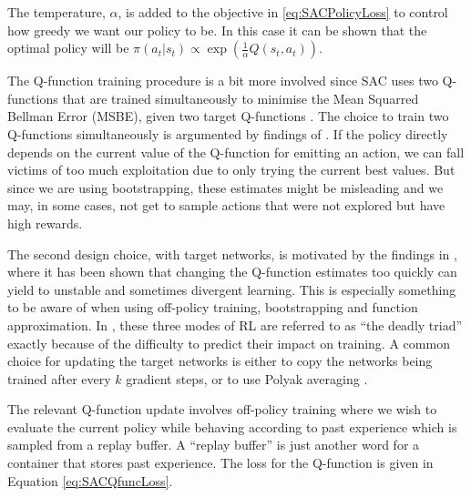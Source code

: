 \documentclass{report}
\numberwithin{equation}{section}
\numberwithin{figure}{section}
\numberwithin{table}{section}
\numberwithin{algorithm}{section}
\begin{document}
The temperature, $\alpha$, is added to the objective in 
\ref{eq:SACPolicyLoss} to control how greedy we want our policy 
to be. In this case it can be shown that the optimal policy 
will be $\pi(a_t|s_t)\propto\exp\left(\frac{1}{\alpha}Q(s_t,a_t)\right)$.

The Q-function training procedure is a bit more involved 
since SAC uses two Q-functions \citep{HasseltDoubleQlearning} 
that are trained simultaneously to 
minimise the Mean Squarred Bellman Error (MSBE), given two 
target Q-functions \citep{DQN}. The choice to train 
two Q-functions simultaneously 
is argumented by findings of \cite{HasseltDoubleQlearning}. 
If the policy directly depends on the current 
value of the Q-function for emitting an action, we can fall 
victims of too much exploitation due to only trying the current 
best values. But since we are using bootstrapping, these 
estimates might be misleading and we may, in some cases, not 
get to sample actions that were not explored but have 
high rewards.

The second design choice, with target networks, 
is motivated by the findings in \cite{DQN}, 
where it has been shown that changing the Q-function estimates 
too quickly can yield to unstable and sometimes divergent learning. 
This is especially something to be aware of when using 
off-policy training, bootstrapping and function approximation.
In \cite{Sutton1998}, these three modes of RL are referred to 
as ``the deadly triad'' exactly because of the difficulty  
to predict their impact on training. A common choice for updating the 
target networks is either to copy the networks being trained 
after every $k$ gradient steps, or to use Polyak averaging 
\citep{PolyakAvg}.

The relevant Q-function update involves off-policy training 
where we wish to evaluate the current policy while behaving 
according to past experience which is sampled from a replay buffer. 
A ``replay buffer'' is just another word for a container that 
stores past experience. 
The loss for the Q-function is given in Equation 
\ref{eq:SACQfuncLoss}.
\end{document}
